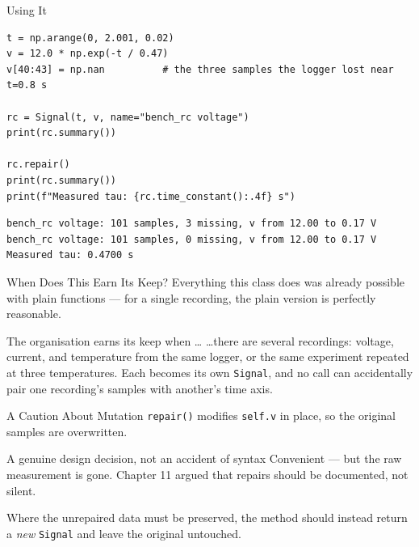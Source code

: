 \documentclass[9pt,aspectratio=169,xcolor=table]{beamer}
\begin{document}
\begin{frame}[fragile]{Using It}
    \leavevmode
\begin{lstlisting}
t = np.arange(0, 2.001, 0.02)
v = 12.0 * np.exp(-t / 0.47)
v[40:43] = np.nan          # the three samples the logger lost near t=0.8 s

rc = Signal(t, v, name="bench_rc voltage")
print(rc.summary())

rc.repair()
print(rc.summary())
print(f"Measured tau: {rc.time_constant():.4f} s")
\end{lstlisting}
\begin{lstlisting}[language={}]
bench_rc voltage: 101 samples, 3 missing, v from 12.00 to 0.17 V
bench_rc voltage: 101 samples, 0 missing, v from 12.00 to 0.17 V
Measured tau: 0.4700 s
\end{lstlisting}
\end{frame}

\begin{frame}{When Does This Earn Its Keep?}
    \leavevmode
    Everything this class does was already possible with plain functions
    --- for a single recording, the plain version is perfectly
    reasonable.

    \vspace{3mm}
    \begin{alertblock}{The organisation earns its keep when \ldots}
        \ldots there are \alert{several} recordings: voltage, current,
        and temperature from the same logger, or the same experiment
        repeated at three temperatures. Each becomes its own
        \texttt{Signal}, and no call can accidentally pair one
        recording's samples with another's time axis.
    \end{alertblock}
\end{frame}

\begin{frame}{A Caution About Mutation}
    \leavevmode
    \texttt{repair()} modifies \texttt{self.v} \alert{in place}, so the
    original samples are overwritten.

    \vspace{3mm}
    \begin{block}{A genuine design decision, not an accident of syntax}
        Convenient --- but the raw measurement is gone. Chapter 11
        argued that repairs should be \alert{documented}, not silent.
    \end{block}

    \vspace{2mm}
    {\small Where the unrepaired data must be preserved, the method
    should instead return a \emph{new} \texttt{Signal} and leave the
    original untouched.}
\end{frame}
\end{document}
